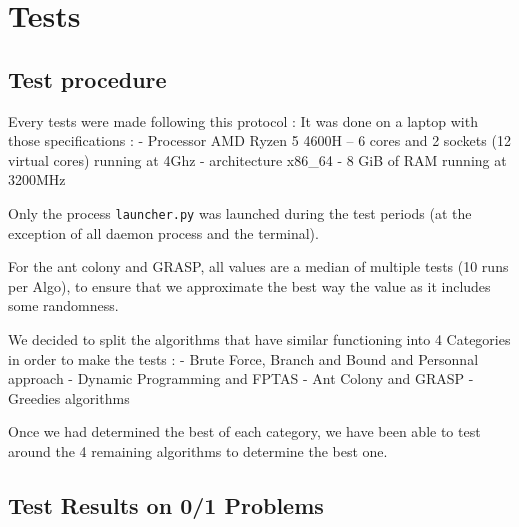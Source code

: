 \documentclass[a4paper, 11pt]{article}
\begin{document}
\section{Tests}
    \subsection{Test procedure}

    Every tests were made following this protocol :
    It was done on a laptop with those specifications :
    \tabto{1.5cm} - Processor AMD Ryzen 5 4600H
    \tabto{2.5cm} -- 6 cores and 2 sockets (12 virtual cores) running at 4Ghz
    \tabto{1.5cm} - architecture x86\_64
    \tabto{1.5cm} - 8 GiB of RAM running at 3200MHz

    Only the process \verb+launcher.py+ was launched during the test periods (at the exception of all daemon process and the terminal).

    For the ant colony and GRASP, all values are a median of multiple tests (10 runs per Algo), to ensure that we approximate the best way the value as it includes some randomness.

    We decided to split the algorithms that have similar functioning into 4 Categories in order to make the tests :
    \tabto{1.5cm} - Brute Force, Branch and Bound and Personnal approach
    \tabto{1.5cm} - Dynamic Programming and FPTAS
    \tabto{1.5cm} - Ant Colony and GRASP
    \tabto{1.5cm} - Greedies algorithms
    
    Once we had determined the best of each category, we have been able to test around the 4 remaining algorithms to determine the best one.

    \subsection{Test Results on 0/1 Problems}
\end{document}
